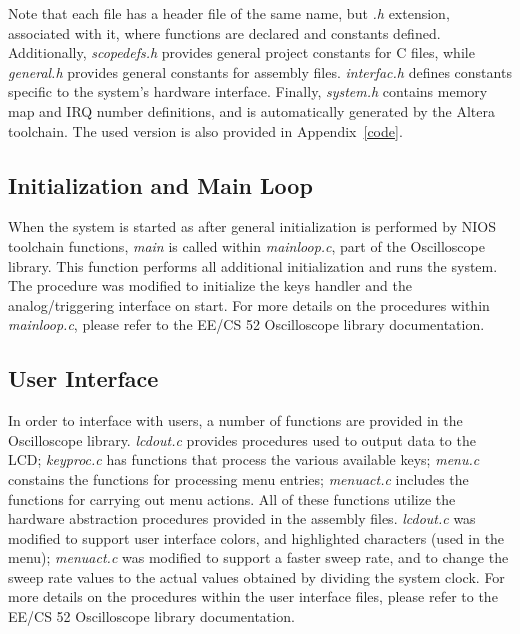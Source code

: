 \documentclass[titlepage]{scrartcl}
\begin{document}
	Note that each file has a header file of the same name, but \textit{.h} extension, associated with it, where functions are declared and constants defined. Additionally, \textit{scopedefs.h} provides general project constants for C files, while \textit{general.h} provides general constants for assembly files. \textit{interfac.h} defines constants specific to the system's hardware interface. Finally, \textit{system.h} contains memory map and IRQ number definitions, and is automatically generated by the Altera toolchain. The used version is also provided in Appendix~\ref{code}.

	\subsection{Initialization and Main Loop}
	When the system is started as after general initialization is performed by NIOS toolchain functions, \textit{main} is called within \textit{mainloop.c}, part of the Oscilloscope library. This function performs all additional initialization and runs the system. The procedure was modified to initialize the keys handler and the analog/triggering interface on start. For more details on the procedures within \textit{mainloop.c}, please refer to the EE/CS 52 Oscilloscope library documentation.\\

	\subsection{User Interface}
	In order to interface with users, a number of functions are provided in the Oscilloscope library. \textit{lcdout.c} provides procedures used to output data to the LCD; \textit{keyproc.c} has functions that process the various available keys; \textit{menu.c} constains the functions for processing menu entries; \textit{menuact.c} includes the functions for carrying out menu actions. All of these functions utilize the hardware abstraction procedures provided in the assembly files. \textit{lcdout.c} was modified to support user interface colors, and highlighted characters (used in the menu); \textit{menuact.c} was modified to support a faster sweep rate, and to change the sweep rate values to the actual values obtained by dividing the system clock. For more details on the procedures within the user interface files, please refer to the EE/CS 52 Oscilloscope library documentation.\\
\end{document}
